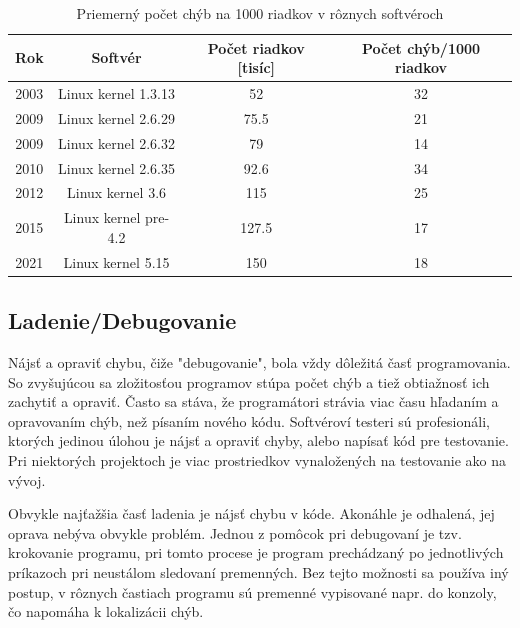 \documentclass[10pt,twoside,slovak,a4paper]{article}
\begin{document}
\begin{table}[]
\caption{Priemerný počet chýb na 1000 riadkov v rôznych softvéroch}
\begin{tabular}{|c|c|c|c|}
\hline
Rok  & Softvér   & Počet riadkov [tisíc] & Počet chýb/1000 riadkov \\
\hline
2003 & Linux kernel 1.3.13        & 52                  & 32                      \\
\hline
2009 & Linux kernel 2.6.29  & 75.5                & 21                      \\
\hline
2009 & Linux kernel 2.6.32  & 79                  & 14                      \\
\hline
2010 & Linux kernel 2.6.35  & 92.6                & 34                      \\
\hline
2012 & Linux kernel 3.6     & 115                 & 25                      \\
\hline
2015 & Linux kernel pre-4.2 & 127.5               & 17                       \\
\hline
2021 & Linux kernel 5.15    & 150                 & 18                     \\
\hline
\end{tabular}
\label{table:tab}
\end{table}

\subsection{Ladenie/Debugovanie}
Nájsť a opraviť chybu, čiže "debugovanie", bola vždy dôležitá časť programovania. So zvyšujúcou sa zložitosťou programov stúpa počet chýb a tiež obtiažnosť ich zachytiť a opraviť. Často sa stáva, že programátori strávia viac času hľadaním a opravovaním chýb, než písaním nového kódu. Softvéroví testeri sú profesionáli, ktorých jedinou úlohou je nájsť a opraviť chyby, alebo napísať kód pre testovanie. Pri niektorých projektoch je viac prostriedkov vynaložených na testovanie ako na vývoj.

Obvykle najťažšia časť ladenia je nájsť chybu v kóde. Akonáhle je odhalená, jej oprava nebýva obvykle problém. Jednou z pomôcok pri debugovaní je tzv. krokovanie programu, pri tomto procese je program prechádzaný po jednotlivých príkazoch pri neustálom sledovaní premenných. Bez tejto možnosti sa používa iný postup, v rôznych častiach programu sú premenné vypisované napr. do konzoly, čo napomáha k lokalizácii chýb.

\end{document}
